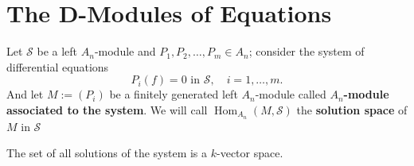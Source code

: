 \documentclass[12pt, oneside]{book}
\begin{document}
\section{The D-Modules of Equations} %



\begin{definition}
    Let $\mathcal{S}$ be a left $A_n$-module and $P_1,P_2,\ldots ,P_m\in A_n$;
    consider the system of differential equations
    \begin{equation*}
        P_i \left(f\right)=0 \text{ in } \mathcal{S} , \quad i=1, \ldots, m .
    \end{equation*}
    And let $M:=\left(P_i\right)$ be a finitely generated left $A_n$-module called \textbf{$A_n$-module associated to the system}.
    We will call $\operatorname{Hom}_{A_n}(M, \mathcal{S})$ the \textbf{solution space} of $M$ in $\mathcal{S}$
    \begin{remark}
        The set of all solutions of the system is a $k$-vector space.
    \end{remark}
\end{definition}
\end{document}
